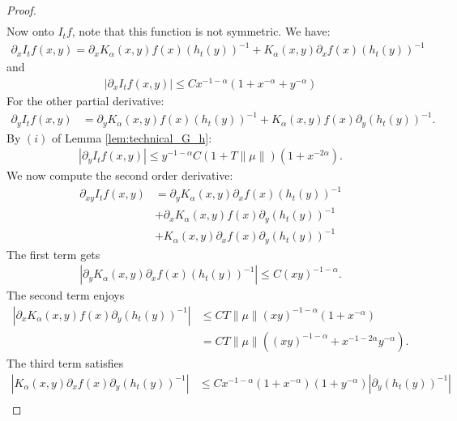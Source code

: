 \documentclass[11pt,a4paper]{article}
\begin{document}
\begin{proof}
\begin{align*}
    \end{align*}
    Now onto $I_tf$, note that this function is not symmetric. We have:
    \begin{align*}
        \partial_x I_tf(x,y) = \partial_x K_\alpha(x,y) f(x) \left(h_t(y)\right)^{-1} + K_\alpha(x,y) \partial_x f(x)  \left(h_t(y)\right)^{-1}
    \end{align*}
    and
    \begin{align*}
        \left| \partial_x I_tf(x,y)\right|  \leq C x^{-1-\alpha} (1 + x^{-\alpha} + y^{-\alpha})
    \end{align*}
    For the other partial derivative:
    \begin{align*}
        \partial_y I_tf(x,y) 
        &= \partial_y K_\alpha(x,y) f(x) \left(h_t(y)\right)^{-1} + K_\alpha(x,y)  f(x) \partial_y \left(h_t(y)\right)^{-1}.
    \end{align*}
    By $(i)$ of Lemma \ref{lem:technical_G_h}:
    \begin{align*}
        \left|\partial_y I_tf(x,y)  \right| \leq y^{-1-\alpha} C(1 + T\|\mu\|)\left(1 + x^{-2\alpha} \right).
    \end{align*}  
    We now compute the second order derivative:
    \begin{align*}
        \partial_{xy} I_tf(x,y) &= \partial_y K_\alpha(x,y) \partial_x f(x)\left(h_t(y)\right)^{-1} \\
        &+ \partial_x K_\alpha(x,y) f(x) \partial_y \left(h_t(y)\right)^{-1} \\
        &+ K_\alpha(x,y)  \partial_x f(x) \partial_y \left(h_t(y)\right)^{-1}
    \end{align*}
    The first term gets
    \begin{align*}
        \left|\partial_y K_\alpha(x,y) \partial_x f(x)\left(h_t(y)\right)^{-1}  \right| \leq C (xy)^{-1-\alpha}.
    \end{align*}
    The second term enjoys
    \begin{align*}
        \left| \partial_x K_\alpha(x,y) f(x) \partial_y \left(h_t(y)\right)^{-1} \right| 
        &\leq CT\|\mu\| (xy)^{-1-\alpha} (1 + x^{-\alpha}) \\
        &= CT\|\mu\| \left((xy)^{-1-\alpha} + x^{-1-2\alpha}y^{-\alpha}\right).
    \end{align*}
    The third term satisfies
    \begin{align*}
        \left|K_\alpha(x,y)  \partial_x f(x) \partial_y \left(h_t(y)\right)^{-1}\right| 
        &\leq Cx^{-1-\alpha}(1 + x^{-\alpha})(1 + y^{-\alpha})\left| \partial_y \left(h_t(y)\right)^{-1}\right|\\

\end{align*}
\end{proof}
\end{document}
